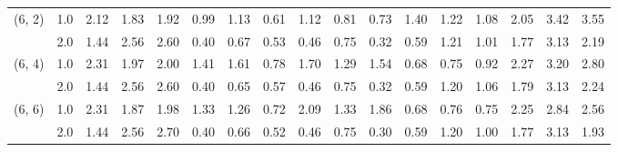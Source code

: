 \begin{tabular}{llrrrrrrrrrrrrrrr}
(6, 2) & 1.0 &   2.12 & 1.83 & 1.92 &    0.99 & 1.13 & 0.61 &    1.12 & 0.81 & 0.73 & 1.40 & 1.22 & 1.08 & 2.05 & 3.42 & 3.55 \\
       & 2.0 &   1.44 & 2.56 & 2.60 &    0.40 & 0.67 & 0.53 &    0.46 & 0.75 & 0.32 & 0.59 & 1.21 & 1.01 & 1.77 & 3.13 & 2.19 \\
(6, 4) & 1.0 &   2.31 & 1.97 & 2.00 &    1.41 & 1.61 & 0.78 &    1.70 & 1.29 & 1.54 & 0.68 & 0.75 & 0.92 & 2.27 & 3.20 & 2.80 \\
       & 2.0 &   1.44 & 2.56 & 2.60 &    0.40 & 0.65 & 0.57 &    0.46 & 0.75 & 0.32 & 0.59 & 1.20 & 1.06 & 1.79 & 3.13 & 2.24 \\
(6, 6) & 1.0 &   2.31 & 1.87 & 1.98 &    1.33 & 1.26 & 0.72 &    2.09 & 1.33 & 1.86 & 0.68 & 0.76 & 0.75 & 2.25 & 2.84 & 2.56 \\
       & 2.0 &   1.44 & 2.56 & 2.70 &    0.40 & 0.66 & 0.52 &    0.46 & 0.75 & 0.30 & 0.59 & 1.20 & 1.00 & 1.77 & 3.13 & 1.93 \\
\bottomrule
\end{tabular}
